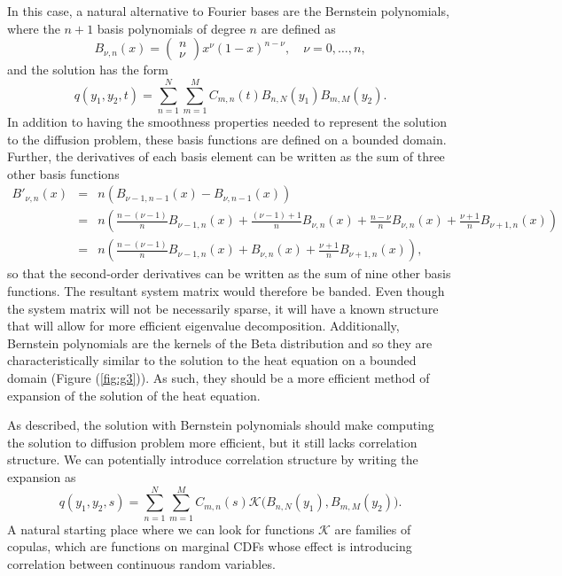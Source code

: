 In this case, a natural alternative to Fourier bases are the Bernstein polynomials, where the $n+1$ basis polynomials of degree $n$ are defined as
\begin{equation}
	B_{\nu,n}(x) = \left( \begin{array}{c} n \\ \nu \end{array} \right) x^\nu (1-x)^{n-\nu}, \quad \nu = 0, \ldots, n,
\end{equation} 
and the solution has the form 
\[ q(y_1, y_2, t) = \sum_{n=1}^N \sum_{m=1}^M C_{m,n}(t) B_{n,N}(y_1) B_{m,M}(y_2). \]
%
In addition to having the smoothness properties needed to represent the solution to the diffusion problem, these basis functions are defined on a bounded domain. Further, the derivatives of each basis element can be written as the sum of three other basis functions
\begin{eqnarray*}
	B'_{\nu,n}(x) &=& n( B_{\nu-1,n-1}(x) - B_{\nu, n-1}(x)) \\
				&=& n\left( \frac{n - (\nu-1)}{n} B_{\nu-1,n}(x) + \frac{(\nu-1) + 1}{n} B_{\nu,n}(x) + \frac{n - \nu}{n} B_{\nu,n}(x) + \frac{\nu + 1}{n} B_{\nu+1,n}(x) \right) \\
				&=& n\left( \frac{n - (\nu-1)}{n} B_{\nu-1,n}(x) + B_{\nu,n}(x) + \frac{\nu + 1}{n} B_{\nu+1,n}(x) \right),
\end{eqnarray*}
so that the second-order derivatives can be written as the sum of nine other basis functions. The resultant system matrix would therefore be banded. Even though the system matrix will not be necessarily sparse, it will have a known structure that will allow for more efficient eigenvalue decomposition. Additionally, Bernstein polynomials are the kernels of the Beta distribution and so they are characteristically similar to the solution to the heat equation on a bounded domain (Figure (\ref{fig:g3})). As such, they should be a more efficient method of expansion of the solution of the heat equation.

As described, the solution with Bernstein polynomials should make computing the solution to diffusion problem more efficient, but it still lacks correlation structure. We can potentially introduce correlation structure by writing the expansion as 
\[ q(y_1, y_2, s) = \sum_{n=1}^N \sum_{m=1}^M C_{m,n}(s) \mathcal{K}\bigg(B_{n,N}(y_1) , B_{m,M}(y_2) \bigg). \]
A natural starting place where we can look for functions $\mathcal{K}$ are families of copulas, which are functions on marginal CDFs whose effect is introducing correlation between continuous random variables. 

